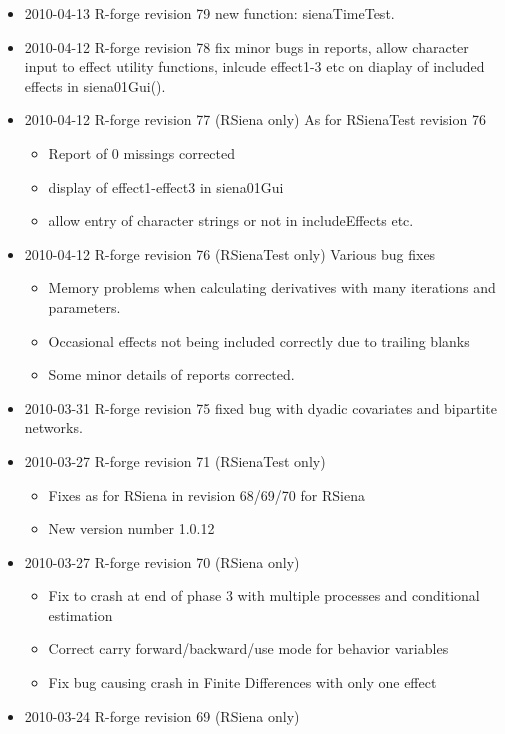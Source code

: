 \documentclass[a4paper,fleqn,11pt]{article}
\newcommand{\+}{\, + \,}
\begin{document}
{\begin{small}
\begin{itemize}
\item 2010-04-13 R-forge revision 79 new function: sienaTimeTest.
\item 2010-04-12 R-forge revision 78 fix minor bugs in reports, allow character
  input to effect utility functions, inlcude effect1-3 etc on diaplay of
  included effects in siena01Gui().
\item 2010-04-12 R-forge revision 77 (RSiena only) As for RSienaTest revision 76
\begin{itemize}
\item Report of 0 missings corrected
\item display of effect1-effect3 in siena01Gui
\item allow entry of character strings or not in includeEffects etc.
\end{itemize}
\item 2010-04-12 R-forge revision 76 (RSienaTest only) Various bug fixes
\begin{itemize}
\item Memory problems when calculating derivatives with many iterations and
  parameters.
\item Occasional effects not being included correctly due to trailing blanks
\item Some minor details of reports corrected.
\end{itemize}
\item 2010-03-31 R-forge revision 75 fixed bug with dyadic covariates and
  bipartite networks.
\item 2010-03-27 R-forge revision 71 (RSienaTest only)
\begin{itemize}
\item Fixes as for RSiena in revision 68/69/70 for RSiena
\item New version number 1.0.12
\end{itemize}
\item 2010-03-27 R-forge revision 70 (RSiena only)
\begin{itemize}
\item Fix to crash at end of phase 3 with multiple processes and
conditional estimation
\item Correct carry forward/backward/use mode for behavior variables
\item Fix bug causing crash in Finite Differences with only one effect
\end{itemize}
\item 2010-03-24 R-forge revision 69 (RSiena only)
\begin{itemize}

\end{itemize}
\end{itemize}
\end{small}}
\end{document}
